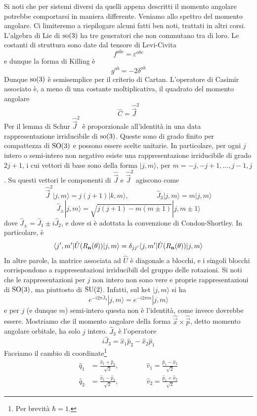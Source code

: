 \documentclass[a4paper, 11pt]{article}
\newcommand{\op}[1]{\hat{#1}}
\renewcommand{\op}[1]{\hat{#1}}
\renewcommand{\ket}[1]{| #1\rangle}
\begin{document}
Si noti che per sistemi diversi da quelli appena descritti il momento angolare potrebbe comportarsi in maniera differente. Veniamo allo spettro del momento angolare. Ci limiteremo a riepilogare alcuni fatti ben noti, trattati in altri corsi. L'algebra di Lie di $\mathrm{so}(3)$ ha tre generatori che non commutano tra di loro. Le costanti di struttura sono date dal tensore di Levi-Civita
\[f^{abc}=\varepsilon^{abc}\]
e dunque la forma di Killing è
\[g^{ab}=-2\delta^{ab}\]
Dunque $\mathrm{so}(3)$ è semisemplice per il criterio di Cartan. L'operatore di Casimir associato è, a meno di una costante moltiplicativa, il quadrato del momento angolare
\[\op C=\op{\vec{J}}^2\]
Per il lemma di Schur $\op{\vec{J}}^2$ è proporzionale all'identità in una data rappresentazione irriducibile di $\mathrm{so}(3)$. Queste sono di grado finito per compattezza di $\mathrm{SO}(3)$ e possono essere scelte unitarie. In particolare, per ogni $j$ intero o semi-intero non negativo esiste una rappresentazione irriducibile di grado $2j+1$, i cui vettori di base sono della forma $\ket{j,m}$, per $m=-j,-j+1,\dots,j-1,j$. Su questi vettori le componenti di $\op{\vec{J}}$ e $\op{\vec{J}}^2$ agiscono come
\[\op{\vec{J}}^2\ket{j,m}=j(j+1)\ket{k,m},\qquad\qquad \op J_3\ket{j,m}=m\ket{j,m}\]\[\op J_\pm\ket{j,m}=\sqrt{j(j+1)-m(m\pm1)}\ket{j,m\pm1}\]
dove $\op J_\pm=\op J_1\pm i\op J_2$, e dove si è adottata la convenzione di Condon-Shortley. In particolare, è
\[\braketop{j',m'}{\op U(R_\vec{n}(\theta))}{j,m}=\delta_{jj'}\braketop{j,m'}{\op U(R_\vec{n}(\theta))}{j,m}\]
In altre parole, la matrice associata ad $\op U$ è diagonale a blocchi, e i singoli blocchi corrispondono a rappresentazioni irriducibili del gruppo delle rotazioni. Si noti che le rappresentazioni per $j$ non intero non sono vere e proprie rappresentazioni di $\mathrm{SO}(3)$, ma piuttosto di $\mathrm{SU}(2)$. Infatti, sul ket $\ket{j,m}$ si ha
\[e^{-i2\pi\op J_3}\ket{j,m}=e^{-i2\pi m}\ket{j,m}\]
e per $j$ (e dunque $m$) semi-intero questa non è l'identità, come invece dovrebbe essere. Mostriamo che il momento angolare della forma $\op{\vec{x}}\times\op{\vec{p}}$, detto momento angolare orbitale, ha solo $j$ intero. $\op J_3$ è l'operatore
\[i\op J_3=\op x_1\op p_2-\op x_2\op p_1\]
Facciamo il cambio di coordinate\footnote{Per brevità $\hbar=1$.}
\begin{align*}
	\op q_1&=\frac{\op x_1+\op p_2}{\sqrt{2}},\qquad\qquad \op v_1=\frac{\op p_1-\op x_2}{\sqrt{2}}\\
	\op q_2&=\frac{\op x_1-\op p_2}{\sqrt{2}},\qquad\qquad \op v_2=\frac{\op p_1+\op x_2}{\sqrt{2}}
\end{align*}
\end{document}

